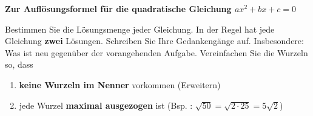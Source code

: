 



\usepackage{amssymb} 
\renewcommand{\metaHeaderLine}{Arbeitsblatt}
\renewcommand{\arbeitsblattTitel}{Lösungsformel zur quadratischen Gleichung}

\arbeitsblattHeader{}
\textbf{Zur Auflösungsformel für die quadratische Gleichung $ax^2+bx+c=0$}

Bestimmen Sie die Lösungsmenge jeder Gleichung. In der Regel hat jede
Gleichung \textbf{zwei} Lösungen. Schreiben Sie Ihre Gedankengänge
auf. Insbesondere: Was ist neu gegenüber der vorangehenden
Aufgabe. Vereinfachen Sie die Wurzeln so, dass

\begin{enumerate}[label=\alph*)]
\item \textbf{keine Wurzeln im Nenner} vorkommen (Erweitern)
\item jede Wurzel \textbf{maximal ausgezogen} ist (Bsp. :
$\sqrt{50}=\sqrt{2 \cdot 25} =5 \sqrt{2}$)
\end{enumerate}

\newcommand{\noteSpace}{\noTRAINER{\rule{0pt}{6.5ex}}}

